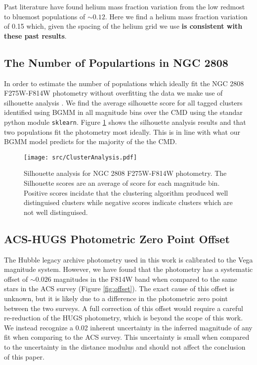 Past literature \citep[e.g. ][]{Milone2015, Milone2018} have found helium mass
fraction variation from the low redmost to bluemost populations of $\sim 0.12$.
Here we find a helium mass fraction variation of 0.15 which, given the spacing
of the helium grid we use \textbf{is consistent with these past results}.

\subsection{The Number of Populartions in NGC 2808}
In order to estimate the number of populations which ideally fit the NGC 2808
F275W-F814W photometry without overfitting the data we make use of silhouette
analysis \citep[][and in a similar manner to how \citet{Valle2022} preform
their analysis of spectroscopic data]{ROUSSEEUW198753}. We find the average
silhouette score for all tagged clusters identified using BGMM in all magnitude
bins over the CMD using the standar python module \texttt{sklearn}. Figure
\ref{fig:clusterAn} shows the silhouette analysis results and that two
populations fit the photometry most ideally. This is in line with what our BGMM
model predicts for the majority of the the CMD.

\begin{figure}
  \centering
  \texttt{[image: src/ClusterAnalysis.pdf]}
  \caption{Silhouette analysis for NGC 2808 F275W-F814W photometry. The Silhouette scores
  are an average of score for each magnitude bin. Positive scores incidate that the clustering
  algorithm produced well distinguised clusters while negative scores indicate clusters which are not
  well distinguised.}
  \label{fig:clusterAn}
\end{figure}


\subsection{ACS-HUGS Photometric Zero Point Offset}
The Hubble legacy archive photometry used in this work is calibrated to the
Vega magnitude system. However, we have found that the photometry has a
systematic offset of $\sim0.026$ magnitudes in the F814W band when
compared to the same stars in the ACS survey (Figure \ref{fig:offset}). The
exact cause of this offset is unknown, but it is likely due to a difference in
the photometric zero point between the two surveys. A full correction of this
offset would require a careful re-reduction of the HUGS photometry, which is
beyond the scope of this work. We instead recognize a 0.02 inherent uncertainty
in the inferred magnitude of any fit when comparing to the ACS survey. This
uncertainty is small when compared to the uncertainty in the
distance modulus and should not affect the conclusion of this
paper. 

